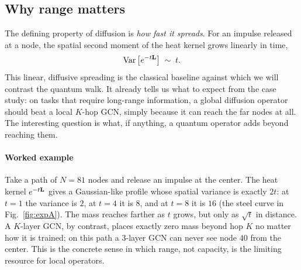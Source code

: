 \subsection{Why range matters}
The defining property of diffusion is \emph{how fast it spreads}. For an impulse
released at a node, the spatial second moment of the heat kernel grows linearly in
time,
\begin{equation}
\operatorname{Var}\big[e^{-t\mathbf{L}}\big]\;\sim\;t .
\label{eq:diffusive}
\end{equation}
This linear, diffusive spreading is the classical baseline against which we will
contrast the quantum walk. It already tells us what to expect from the case study:
on tasks that require long-range information, a global diffusion operator should beat
a local $K$-hop GCN, simply because it can reach the far nodes at all. The interesting
question is what, if anything, a quantum operator adds beyond reaching them.

\paragraph*{Worked example} Take a path of $N=81$ nodes and release an impulse at the
center. The heat kernel $e^{-t\mathbf{L}}$ gives a Gaussian-like profile whose spatial
variance is exactly $2t$: at $t=1$ the variance is $2$, at $t=4$ it is $8$, and at
$t=8$ it is $16$ (the steel curve in Fig.~\ref{fig:expA}). The mass reaches farther as
$t$ grows, but only as $\sqrt{t}$ in distance. A $K$-layer GCN, by contrast, places
exactly zero mass beyond hop $K$ no matter how it is trained; on this path a $3$-layer
GCN can never see node $40$ from the center. This is the concrete sense in which range,
not capacity, is the limiting resource for local operators.
